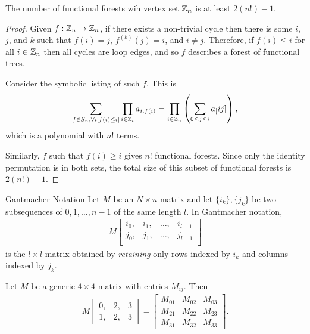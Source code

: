 \begin{prop}
    The number of functional forests wih vertex set $\mathbb{Z}_n$ is at least $2(n!)-1$.
\end{prop}

\begin{proof}
    Given $f: \mathbb{Z}_n \to \mathbb{Z}_n$, if there exists a non-trivial cycle then there is some $i$, $j$, and $k$ such that $f(i) = j$, $f^(k)(j) =i$, and $i \neq j$. Therefore, if $f(i) \leq i$ for all $i \in \mathbb{Z}_n$ then all cycles are loop edges, and so $f$ describes a forest of functional trees.

    Consider the symbolic listing of such $f$. This is
    \begin{align}
        \sum_{f\in S_n,\forall i[f(i)\leq i]}\prod_{i \in \mathbb{Z}_i}a_{i,f(i)} = \prod_{i\in\mathbb{Z}_n}\left(\sum_{0\leq j \leq i}a_[ij]\right),
    \end{align}
    which is a polynomial with $n!$ terms.

    Similarly, $f$ such that $f(i) \geq i$ gives $n!$ functional forests. Since only the identity permutation is in both sets, the total size of this subset of functional forests is $2(n!) - 1$.
\end{proof}

\begin{defn}{Gantmacher Notation}\proofbreak
    Let $M$ be an $N\times n$ matrix and let $\{i_k\}, \{j_k\}$ be two subsequences of $0, 1, \ldots, n-1$ of the same length $l$. In Gantmacher notation,
    \begin{align*}
        M\begin{bmatrix}
            i_0, &i_1, &\ldots, &i_{l-1} \\
            j_0, &j_1, &\ldots, &j_{l-1} \\
        \end{bmatrix}
    \end{align*}
    is the $l\times l$ matrix obtained by \emph{retaining} only rows indexed by $i_k$ and columns indexed by $j_k$.
\end{defn}

\begin{exmp}
    Let $M$ be a generic $4 \times 4$ matrix with entries $M_{ij}$. Then
    \begin{align*}
        M\begin{bmatrix}
            0, &2, &3 \\ 1, &2, &3
        \end{bmatrix} = \begin{bmatrix}
            M_{01} & M_{02} & M_{03} \\
            M_{21} & M_{22} & M_{23} \\
            M_{31} & M_{32} & M_{33}
        \end{bmatrix}.
    \end{align*}
\end{exmp}

